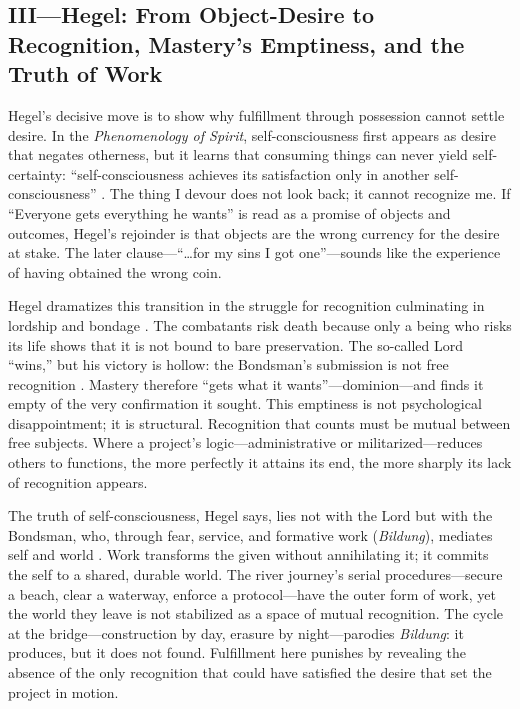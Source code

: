 \subsection*{III—Hegel: From Object-Desire to Recognition, Mastery's Emptiness, and the Truth of
	Work}
\label{ssec:iii-hegel}
Hegel's decisive move is to show why fulfillment through possession cannot settle desire. In the
\emph{Phenomenology of Spirit}, self-consciousness first appears as desire that negates
otherness, but it learns that consuming things can never yield self-certainty:
``self-consciousness achieves its satisfaction only in another self-consciousness''
\parencite[\S 175]{HegelPhenomenology1977}. The thing I devour does not look back; it cannot
recognize me. If ``Everyone gets everything he wants'' is read as a promise of objects and
outcomes, Hegel's rejoinder is that objects are the wrong currency for the desire at stake.
The later clause—``\ldots for my sins I got one''—sounds like the experience of having obtained
the wrong coin.

Hegel dramatizes this transition in the struggle for recognition culminating in lordship and
bondage \parencite[\S\S 178--196]{HegelPhenomenology1977}. The combatants risk death because
only a being who risks its life shows that it is not bound to bare preservation. The so-called
Lord ``wins,'' but his victory is hollow: the Bondsman's submission is not free recognition
\parencite[\S\S 187--189]{HegelPhenomenology1977}. Mastery therefore ``gets what it
wants''—dominion—and
finds it empty of the very confirmation it sought. This emptiness is not psychological
disappointment; it is structural. Recognition that counts must be mutual between free subjects.
Where a project's logic—administrative or militarized—reduces others to functions, the more
perfectly it attains its end, the more sharply its lack of recognition appears.

The truth of self-consciousness, Hegel says, lies not with the Lord but with the Bondsman, who,
through fear, service, and formative work (\emph{Bildung}), mediates self and world
\parencite[\S 196]{HegelPhenomenology1977}. Work transforms the given without annihilating it;
it commits the self to a shared, durable world. The river journey's serial procedures—secure a
beach, clear a waterway, enforce a protocol—have the outer form of work, yet the world they
leave is not stabilized as a space of mutual recognition. The cycle at the bridge—construction
by day, erasure by night—parodies \emph{Bildung}: it produces, but it does not found.
Fulfillment here punishes by revealing the absence of the only recognition that could have
satisfied the desire that set the project in motion.

